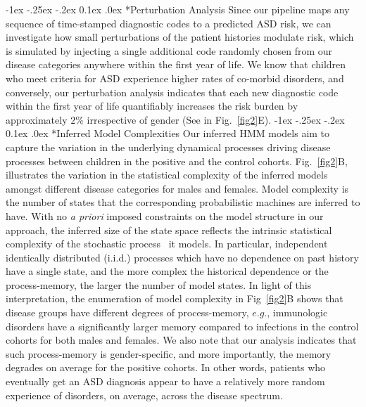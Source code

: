\documentclass[onecolumn,,10pt]{IEEEtran}
\makeatletter
\renewcommand\subsection{\@startsection {section}{1}{\z@}%
  {-1ex \@plus -.25ex \@minus -.2ex}%
  {0.1ex \@plus.0ex}%
  {\fontsize{11}{12}\selectfont\bfseries\sffamily\color{DodgerBlue4}}}
\def\treatment{positive\xspace}
\makeatother
\begin{document}

\subsection*{Perturbation Analysis}
Since our pipeline maps any sequence of time-stamped diagnostic codes to a predicted ASD risk, we can investigate how small perturbations of the patient histories modulate risk, which is  simulated by injecting a single additional code randomly chosen from our disease categories anywhere within the first year of life. We  know that  children who meet criteria for ASD experience higher rates of co-morbid disorders, and conversely, our perturbation analysis indicates that each new diagnostic code within the first year of life quantifiably increases the risk burden by approximately $2\%$ irrespective of gender (See in Fig.~\ref{fig2}E).
%
\subsection*{Inferred Model Complexities}
Our inferred HMM models aim to capture the variation in the underlying dynamical processes driving disease processes between children in the \treatment and the control cohorts.
Fig.~\ref{fig2}B, illustrates the variation in the statistical complexity of the inferred models amongst different disease categories for males and females. Model complexity is the number of states that the corresponding probabilistic machines are inferred to have. With no \textit{a priori} imposed constraints on the model structure in our approach, the inferred size of the state space  reflects the intrinsic statistical complexity of the stochastic process~\cite{CRUTCHFIELD199411} it models. In particular, independent identically distributed (i.i.d.)  processes which have no dependence on past history have a single state, and the more complex the historical dependence or the process-memory, the larger the number of model states. In  light of this interpretation, the enumeration of  model complexity in Fig~\ref{fig2}B  shows that  disease groups have different degrees of process-memory, $e.g.$, immunologic disorders have a significantly larger memory compared to infections in the control cohorts for both males and females. We also note that our analysis indicates that such process-memory is gender-specific, and more importantly, the memory degrades on average for the \treatment cohorts. In other words, patients who eventually get an ASD diagnosis appear to have a relatively more random experience of disorders, on average, across the disease spectrum.%
%
\end{document}
